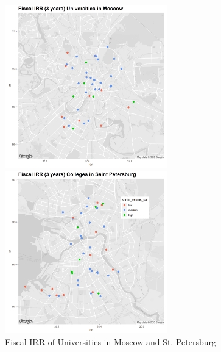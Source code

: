 \documentclass[alpha-refs]{wiley-article-05g}
\begin{document}
\begin{figure}[htp]
	\begin{minipage}[b]{.5\linewidth}
		\centering
		\hspace*{-0.4in}
		\includegraphics[width=200pt]{social_returns_moscow.png}
	\end{minipage}
	\hfill
	\begin{minipage}[b]{.5\linewidth}
		\centering
		\hspace*{-0.2in}
		\includegraphics[width=200pt]{social_returns_spb.png}
	\end{minipage}
	\caption{Fiscal IRR of Universities in Moscow and St. Petersburg}\label{fig:1.17}
\end{figure}




\vspace{-0.2in}
\end{document}
